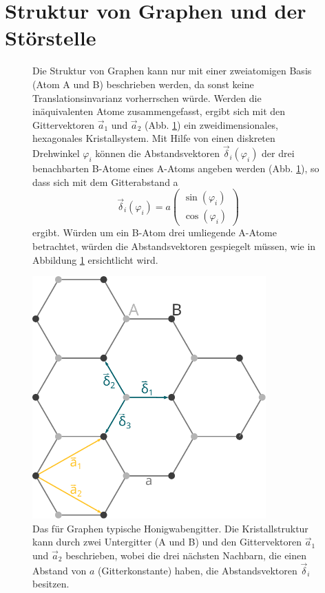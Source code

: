 \section{Struktur von Graphen und der Störstelle}
\label{sec:structure}
\FloatBarrier
\begin{figure}
    \begin{minipage}{0.49\textwidth}
        Die Struktur von Graphen kann nur mit einer zweiatomigen Basis (Atom A und B) beschrieben werden, da sonst keine Translationsinvarianz vorherrschen würde.
        Werden die inäquivalenten Atome zusammengefasst, ergibt sich mit den Gittervektoren $\vec{a}_1$ und $\vec{a}_2$ (Abb. \ref{fig:graphene_lattice}) ein zweidimensionales, hexagonales Kristallsystem.
        Mit Hilfe von einen diskreten Drehwinkel $\varphi_i$ können die Abstandsvektoren $\vec{\delta}_i(\varphi_i)$ der drei benachbarten B-Atome eines A-Atoms angeben werden
        (Abb. \ref{fig:graphene_lattice}), so dass sich mit dem Gitterabstand a
        \begin{equation*}
            \vec{\delta}_i(\varphi_i) = a\begin{pmatrix} \sin (\varphi_i) \\ \cos (\varphi_i)     \end{pmatrix}
        \end{equation*}
        ergibt.
        Würden um ein B-Atom drei umliegende A-Atome betrachtet, würden die Abstandsvektoren gespiegelt müssen, wie in Abbildung \ref{fig:graphene_lattice} 
        ersichtlicht wird.  
    \end{minipage}
    \hfill
    \begin{minipage}{0.5\textwidth}
        \centering
            \includegraphics[width=0.8\textwidth]{Plots/graphene_lattice.pdf}
            \captionsetup{width=0.9\textwidth}
            \caption{Das für Graphen typische Honigwabengitter. Die Kristallstruktur kann durch zwei Untergitter (A und B) und den 
            Gittervektoren $\vec{a}_1$ und $\vec{a}_2$ beschrieben, wobei
            die drei nächsten Nachbarn, die einen Abstand von $a$ (Gitterkonstante) haben, die Abstandsvektoren $\vec{\delta}_i$ besitzen.}
            \label{fig:graphene_lattice}
       \end{minipage}
\end{figure}
